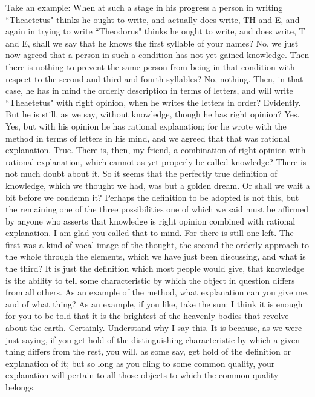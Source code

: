 \documentclass[letterpaper,12pt]{article}
\newcommand{\stephpag}[1]{\marginnote{\small\itshape\fontfamily{ppl}\selectfont #1}}
\begin{document}
\begin{drama}
\socratesspeaks
Take an example: When at such a stage in his progress a person in writing ``Theaetetus" thinks he ought to write, \stephpag{208 a} and actually does write, TH and E, and again in trying to write ``Theodorus" thinks he ought to write, and does write, T and E, shall we say that he knows the first syllable of your names?
\theaetetusspeaks
No, we just now agreed that a person in such a condition has not yet gained knowledge.
\socratesspeaks
Then there is nothing to prevent the same person from being in that condition with respect to the second and third and fourth syllables?
\theaetetusspeaks
No, nothing.
\socratesspeaks
Then, in that case, he has in mind the orderly description in terms of letters, and will write ``Theaetetus" with right opinion, when he writes the letters in order?
\theaetetusspeaks
Evidently. \stephpag{b}
\socratesspeaks
But he is still, as we say, without knowledge, though he has right opinion?
\theaetetusspeaks
Yes.
\socratesspeaks
Yes, but with his opinion he has rational explanation; for he wrote with the method in terms of letters in his mind, and we agreed that that was rational explanation.
\theaetetusspeaks
True.
\socratesspeaks
There is, then, my friend, a combination of right opinion with rational explanation, which cannot as yet properly be called knowledge?
\theaetetusspeaks
There is not much doubt about it.
\socratesspeaks
So it seems that the perfectly true definition of knowledge, which we thought we had, was but a golden dream. Or shall we wait a bit before we condemn it? Perhaps the definition to be adopted is not this, \stephpag{c} but the remaining one of the three possibilities one of which we said must be affirmed by anyone who asserts that knowledge is right opinion combined with rational explanation.
\theaetetusspeaks
I am glad you called that to mind. For there is still one left. The first was a kind of vocal image of the thought, the second the orderly approach to the whole through the elements, which we have just been discussing, and what is the third?
\socratesspeaks
It is just the definition which most people would give, that knowledge is the ability to tell some characteristic by which the object in question differs from all others.
\theaetetusspeaks
As an example of the method, what explanation can you give me, and of what thing? \stephpag{d}
\socratesspeaks
As an example, if you like, take the sun: I think it is enough for you to be told that it is the brightest of the heavenly bodies that revolve about the earth.
\theaetetusspeaks
Certainly.
\socratesspeaks
Understand why I say this. It is because, as we were just saying, if you get hold of the distinguishing characteristic by which a given thing differs from the rest, you will, as some say, get hold of the definition or explanation of it; but so long as you cling to some common quality, your explanation will pertain to all those objects to which the common quality belongs. \stephpag{e}

\end{drama}
\end{document}
